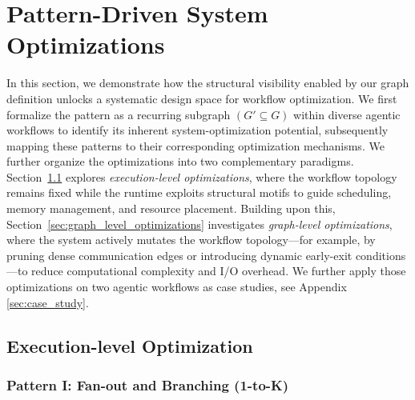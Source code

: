 \section{Pattern-Driven System Optimizations}
\label{sec:pattern-driven_system_optimizations}

In this section, we demonstrate how the structural visibility enabled by our graph definition unlocks a systematic design space for workflow optimization. We first formalize the pattern as a recurring subgraph $(G' \subseteq G)$ within diverse agentic workflows to identify its inherent system-optimization potential, subsequently mapping these patterns to their corresponding optimization mechanisms. We further organize the optimizations into two complementary paradigms. Section~\ref{sec:execution_level_opt} explores \textit{execution-level optimizations}, where the workflow topology remains fixed while the runtime exploits structural motifs to guide scheduling, memory management, and resource placement. Building upon this, Section~\ref{sec:graph_level_optimizations} investigates \textit{graph-level optimizations}, where the system actively mutates the workflow topology---for example, by pruning dense communication edges or introducing dynamic early-exit conditions---to reduce computational complexity and I/O overhead. We further apply those optimizations on two agentic workflows as case studies, see Appendix \ref{sec:case_study}.



\subsection{Execution-level Optimization}
\label{sec:execution_level_opt}

\subsubsection{Pattern I: Fan-out and Branching (1-to-K)}
\begin{center}
\end{center}

